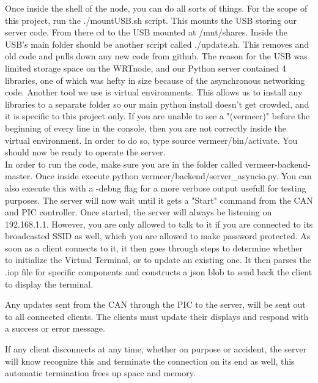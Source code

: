 \documentclass[paper=a4, fontsize=11pt]{scrartcl}
\numberwithin{equation}{section}		%
\numberwithin{figure}{section}			%
\numberwithin{table}{section}				%
\begin{document}
 Once inside the shell of the node, you can do all sorts of things. For the scope of this project, run the ./mountUSB.sh script. This mounts the USB storing our server code. From there cd to the USB mounted at /mnt/shares. Inside the USB's main folder should be another script called ./update.sh. This removes and old code and pulls down any new code from github. The reason for the USB was limited storage space on the WRTnode, and our Python server contained 4 libraries, one of which was hefty in size because of the asynchronous networking code. Another tool we use is virtual environments. This allows us to install any libraries to a separate folder so our main python install doesn't get crowded, and it is specific to this project only. If you are unable to see a "(vermeer)" before the beginning of every line in the console, then you are not correctly inside the virtual environment. In order to do so, type source vermeer/bin/activate. You should now be ready to operate the server.\\ 
 In order to run the code, make sure you are in the folder called vermeer-backend-master. Once inside execute python vermeer/backend/server\_asyncio.py. You can also execute this with a -debug flag for a more verbose output usefull for testing purposes. The server will now wait until it gets a "Start" command from the CAN and PIC controller. Once started, the server will always be listening on 192.168.1.1. However, you are only allowed to talk to it if you are connected to its broadcasted SSID as well, which you are allowed to make password protected. As soon as a client connects to it, it then goes through steps to determine whether to initialize the Virtual Terminal, or to update an existing one. It then parses the .iop file for specific components and constructs a json blob to send back the client to display the terminal. \\
 
 \begin{samepage}
 Any updates sent from the CAN through the PIC to the server, will be sent out to all connected clients. The clients must update their displays and respond with a success or error message. \\
 \end{samepage}
 
 \begin{samepage}
 If any client disconnects at any time, whether on purpose or accident, the server will know recognize this and terminate the connection on its end as well, this automatic termination frees up space and memory. \\
 \end{samepage}
\end{document}
